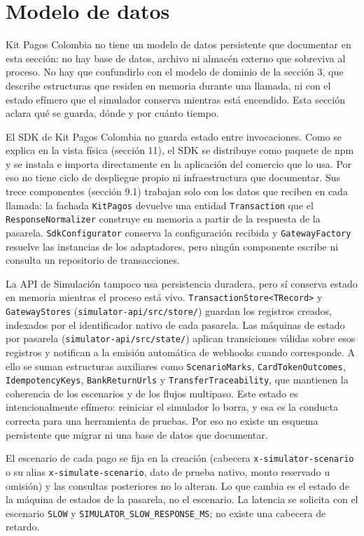 \section{Modelo de datos}
Kit Pagos Colombia no tiene un modelo de datos persistente que documentar en esta sección: no hay base de datos, archivo ni almacén externo que sobreviva al proceso. No hay que confundirlo con el modelo de dominio de la sección 3, que describe estructuras que residen en memoria durante una llamada, ni con el estado efímero que el simulador conserva mientras está encendido. Esta sección aclara qué se guarda, dónde y por cuánto tiempo.

El SDK de Kit Pagos Colombia no guarda estado entre invocaciones. Como se explica en la vista física (sección 11), el SDK se distribuye como paquete de npm y se instala e importa directamente en la aplicación del comercio que lo usa. Por eso no tiene ciclo de despliegue propio ni infraestructura que documentar. Sus trece componentes (sección 9.1) trabajan solo con los datos que reciben en cada llamada: la fachada \texttt{KitPagos} devuelve una entidad \texttt{Transaction} que el \texttt{ResponseNormalizer} construye en memoria a partir de la respuesta de la pasarela. \texttt{SdkConfigurator} conserva la configuración recibida y \texttt{GatewayFactory} resuelve las instancias de los adaptadores, pero ningún componente escribe ni consulta un repositorio de transacciones.

La API de Simulación tampoco usa persistencia duradera, pero sí conserva estado en memoria mientras el proceso está vivo. \texttt{TransactionStore<TRecord>} y \texttt{GatewayStores} (\texttt{simulator-api/src/store/}) guardan los registros creados, indexados por el identificador nativo de cada pasarela. Las máquinas de estado por pasarela (\texttt{simulator-api/src/state/}) aplican transiciones válidas sobre esos registros y notifican a la emisión automática de webhooks cuando corresponde. A ello se suman estructuras auxiliares como \texttt{ScenarioMarks}, \texttt{CardTokenOutcomes}, \texttt{IdempotencyKeys}, \texttt{BankReturnUrls} y \texttt{TransferTraceability}, que mantienen la coherencia de los escenarios y de los flujos multipaso. Este estado es intencionalmente efímero: reiniciar el simulador lo borra, y esa es la conducta correcta para una herramienta de pruebas. Por eso no existe un esquema persistente que migrar ni una base de datos que documentar.

El escenario de cada pago se fija en la creación (cabecera \texttt{x-simulator-scenario} o su alias \texttt{x-simulate-scenario}, dato de prueba nativo, monto reservado u omisión) y las consultas posteriores no lo alteran. Lo que cambia es el estado de la máquina de estados de la pasarela, no el escenario. La latencia se solicita con el escenario \texttt{SLOW} y \texttt{SIMULATOR\_SLOW\_RESPONSE\_MS}; no existe una cabecera de retardo.
